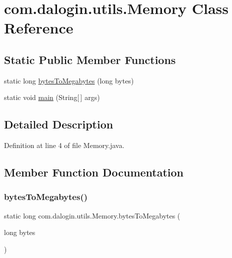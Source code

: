 \hypertarget{classcom_1_1dalogin_1_1utils_1_1_memory}{}\section{com.\+dalogin.\+utils.\+Memory Class Reference}
\label{classcom_1_1dalogin_1_1utils_1_1_memory}
\subsection*{Static Public Member Functions}
\begin{DoxyCompactItemize}
\item 
static long \hyperlink{classcom_1_1dalogin_1_1utils_1_1_memory_a8d329f13031034168f6dc9a233e38d63}{bytes\+To\+Megabytes} (long bytes)
\item 
static void \hyperlink{classcom_1_1dalogin_1_1utils_1_1_memory_af2e3afdc219d69338f1301fee6081a35}{main} (String\mbox{[}$\,$\mbox{]} args)
\end{DoxyCompactItemize}


\subsection{Detailed Description}


Definition at line 4 of file Memory.\+java.



\subsection{Member Function Documentation}
\mbox{\label{classcom_1_1dalogin_1_1utils_1_1_memory_a8d329f13031034168f6dc9a233e38d63}} 
\subsubsection{\texorpdfstring{bytes\+To\+Megabytes()}{bytesToMegabytes()}}
{\footnotesize\ttfamily static long com.\+dalogin.\+utils.\+Memory.\+bytes\+To\+Megabytes (\begin{DoxyParamCaption}\item[{long}]{bytes }\end{DoxyParamCaption})\hspace{0.3cm}{\ttfamily [static]}}



